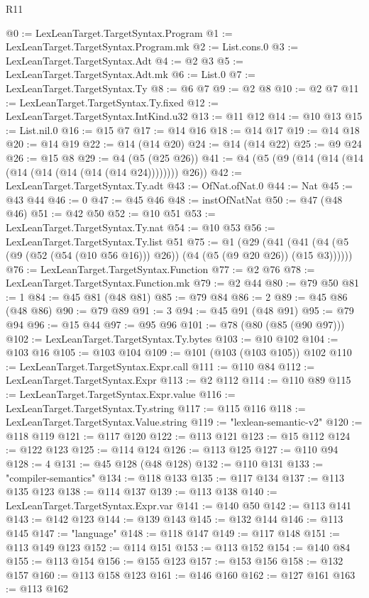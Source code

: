 \begin{lexlean}{R11}
\begin{coremodule}
@0 := LexLeanTarget.TargetSyntax.Program
@1 := LexLeanTarget.TargetSyntax.Program.mk
@2 := List.cons.{0}
@3 := LexLeanTarget.TargetSyntax.Adt
@4 := @2 @3
@5 := LexLeanTarget.TargetSyntax.Adt.mk
@6 := List.{0}
@7 := LexLeanTarget.TargetSyntax.Ty
@8 := @6 @7
@9 := @2 @8
@10 := @2 @7
@11 := LexLeanTarget.TargetSyntax.Ty.fixed
@12 := LexLeanTarget.TargetSyntax.IntKind.u32
@13 := @11 @12
@14 := @10 @13
@15 := List.nil.{0}
@16 := @15 @7
@17 := @14 @16
@18 := @14 @17
@19 := @14 @18
@20 := @14 @19
@22 := @14 (@14 @20)
@24 := @14 (@14 @22)
@25 := @9 @24
@26 := @15 @8
@29 := @4 (@5 (@25 @26))
@41 := @4 (@5 (@9 (@14 (@14 (@14 (@14 (@14 (@14 (@14 (@14 @24)))))))) @26))
@42 := LexLeanTarget.TargetSyntax.Ty.adt
@43 := OfNat.ofNat.{0}
@44 := Nat
@45 := @43 @44
@46 := 0
@47 := @45 @46
@48 := instOfNatNat
@50 := @47 (@48 @46)
@51 := @42 @50
@52 := @10 @51
@53 := LexLeanTarget.TargetSyntax.Ty.nat
@54 := @10 @53
@56 := LexLeanTarget.TargetSyntax.Ty.list @51
@75 := @1
    (@29 (@41 (@41 (@4 (@5 (@9 (@52 (@54 (@10 @56 @16))) @26)) (@4 (@5 (@9 @20 @26)) (@15 @3))))))
@76 := LexLeanTarget.TargetSyntax.Function
@77 := @2 @76
@78 := LexLeanTarget.TargetSyntax.Function.mk
@79 := @2 @44
@80 := @79 @50
@81 := 1
@84 := @45 @81 (@48 @81)
@85 := @79 @84
@86 := 2
@89 := @45 @86 (@48 @86)
@90 := @79 @89
@91 := 3
@94 := @45 @91 (@48 @91)
@95 := @79 @94
@96 := @15 @44
@97 := @95 @96
@101 := @78 (@80 (@85 (@90 @97)))
@102 := LexLeanTarget.TargetSyntax.Ty.bytes
@103 := @10 @102
@104 := @103 @16
@105 := @103 @104
@109 := @101 (@103 (@103 @105)) @102
@110 := LexLeanTarget.TargetSyntax.Expr.call
@111 := @110 @84
@112 := LexLeanTarget.TargetSyntax.Expr
@113 := @2 @112
@114 := @110 @89
@115 := LexLeanTarget.TargetSyntax.Expr.value
@116 := LexLeanTarget.TargetSyntax.Ty.string
@117 := @115 @116
@118 := LexLeanTarget.TargetSyntax.Value.string
@119 := "lexlean-semantic-v2"
@120 := @118 @119
@121 := @117 @120
@122 := @113 @121
@123 := @15 @112
@124 := @122 @123
@125 := @114 @124
@126 := @113 @125
@127 := @110 @94
@128 := 4
@131 := @45 @128 (@48 @128)
@132 := @110 @131
@133 := "compiler-semantics"
@134 := @118 @133
@135 := @117 @134
@137 := @113 @135 @123
@138 := @114 @137
@139 := @113 @138
@140 := LexLeanTarget.TargetSyntax.Expr.var
@141 := @140 @50
@142 := @113 @141
@143 := @142 @123
@144 := @139 @143
@145 := @132 @144
@146 := @113 @145
@147 := "language"
@148 := @118 @147
@149 := @117 @148
@151 := @113 @149 @123
@152 := @114 @151
@153 := @113 @152
@154 := @140 @84
@155 := @113 @154
@156 := @155 @123
@157 := @153 @156
@158 := @132 @157
@160 := @113 @158 @123
@161 := @146 @160
@162 := @127 @161
@163 := @113 @162

\end{coremodule}
\end{lexlean}
